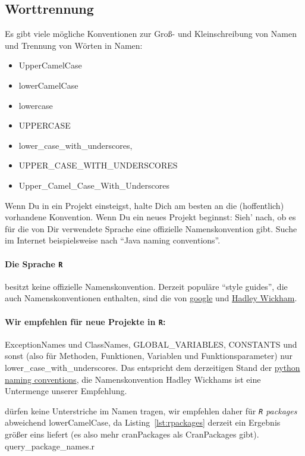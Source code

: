 \documentclass[twoside]{scrreprt}
\providecommand{\R}{\texttt{R}}
\begin{document}
\subsection{Worttrennung}
Es gibt viele m\"o{}gliche Konventionen zur Gro\ss{}- und Kleinschreibung  von
Namen und
Trennung von W\"o{}rten in Namen:
\begin{itemize}
\item UpperCamelCase
\item lowerCamelCase
\item lowercase
\item UPPERCASE
\item lower\_case\_with\_underscores,
\item UPPER\_CASE\_WITH\_UNDERSCORES
\item Upper\_Camel\_Case\_With\_Underscores
\end{itemize}
Wenn Du in ein Projekt einsteigst, halte Dich am besten an die (hoffentlich)
vorhandene Konvention.
Wenn Du ein neues Projekt beginnst: Sieh' nach, ob es f\"u{}r die von Dir
verwendete Sprache eine offizielle Namenskonvention gibt. Suche im Internet
beispielsweise nach "`Java naming conventions"'.

\paragraph{Die Sprache \R{}} besitzt keine offizielle
Namenskonvention. Derzeit
popul\"a{}re "`style guides"', die auch Namenskonventionen enthalten, sind die
von
\href{https://google-styleguide.googlecode.com/svn/trunk/Rguide.xml}{google} und
\href{http://adv-r.had.co.nz/Style.html}{Hadley Wickham}.
\paragraph{Wir empfehlen f\"u{}r neue Projekte in \R{}:}
ExceptionNames und ClassNames, GLOBAL\_VARIABLES, CONSTANTS und sonst (also
f\"u{}r Methoden, Funktionen, Variablen und Funktionsparameter) nur
lower\_case\_with\_underscores.
Das entspricht dem derzeitigen Stand der
\href{http://legacy.python.org/dev/peps/pep-0008/#naming-conventions}{python
  naming conventions}, die Namenskonvention Hadley Wickhams ist eine
  Untermenge unserer Empfehlung.

 d\"urfen keine Unterstriche im Namen
tragen, wir
empfehlen daher f\"u{}r \emph{\R{} packages} abweichend lowerCamelCase,
da Listing~\ref{lst:rpackages} derzeit ein Ergebnis gr\"o{}\ss{}er eins
liefert (es also mehr cranPackages als CranPackages gibt).
%
{query_package_names.r} 
\end{document}
